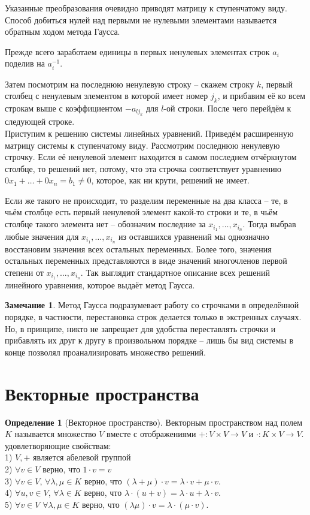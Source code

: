 \documentclass[10pt,a4paper,oneside]{book}
\theoremstyle{definition}
\newtheorem*{rem}{Замечание}
\newtheorem{defn}{Определение}
\def\dfn{\begin{defn}}
\def\edfn{\end{defn}}
\def\rm{\begin{rem}}
\def\erm{\end{rem}}
\begin{document}
Указанные преобразования очевидно приводят матрицу к ступенчатому виду. Способ добиться нулей над первыми не нулевыми элементами называется обратным ходом метода Гаусса. 


Прежде всего заработаем единицы в первых ненулевых элементах строк $a_i$ поделив на $a_i^{-1}$.

Затем посмотрим на последнюю ненулевую строку -- скажем строку $k$, первый  столбец с ненулевым элементом в которой имеет номер $j_k$, и прибавим её ко всем строкам выше с коэффициентом $-a_{lj_k}$ для $l$-ой строки. После чего перейдём к следующей строке.\\



Приступим к решению системы линейных уравнений. Приведём расширенную матрицу системы к ступенчатому виду. Рассмотрим последнюю ненулевую строчку. Если её ненулевой элемент находится в самом последнем отчёркнутом столбце, то решений нет, потому, что эта строчка соответствует уравнению $0x_1+\dots+0x_n=b_1\neq 0$, которое, как ни крути, решений не имеет. 

Если же такого не происходит, то разделим переменные на два класса -- те, в чьём столбце есть первый ненулевой элемент какой-то строки и те, в чьём столбце такого элемента нет -- обозначим последние за $x_{i_1},\dots,x_{i_n}$. Тогда выбрав любые значения для $x_{i_1},\dots,x_{i_n}$ из оставшихся уравнений мы однозначно восстановим значения всех остальных переменных. Более того, значения остальных переменных представляются в виде значений многочленов первой степени от  $x_{i_1},\dots,x_{i_n}$. Так выглядит стандартное описание всех решений линейного уравнения, которое выдаёт метод Гаусса. 

\rm Метод Гаусса подразумевает работу со строчками в определённой порядке, в частности, перестановка строк делается только в экстренных случаях. Но, в принципе, никто не запрещает для удобства переставлять строчки и прибавлять их друг к другу в произвольном порядке -- лишь бы вид системы в конце позволял проанализировать множество решений.
\erm




\section{Векторные пространства}

\dfn[Векторное пространство]
Векторным пространством над полем $K$ называется множество $V$ вместе с отображениями $+\colon V\times V \to V$ и $\cdot \colon K \times V \to V$. удовлетворяющие свойствам:\\
1) $V, +$ является абелевой группой\\
2) $\forall v \in V$ верно, что $1\cdot v=v$\\
3) $\forall v \in V$, $\forall \lambda, \mu \in K$ верно, что $(\lambda+\mu)\cdot v= \lambda\cdot v + \mu \cdot v$.\\
4) $\forall u,v \in V$, $\forall \lambda \in K$ верно, что $\lambda\cdot(u+v)= \lambda\cdot u + \lambda \cdot v$.\\
5) $\forall v \in V$ $\forall \lambda, \mu \in K$ верно, что $(\lambda\mu)\cdot v= \lambda\cdot(\mu \cdot v)$.
\edfn
\end{document}
